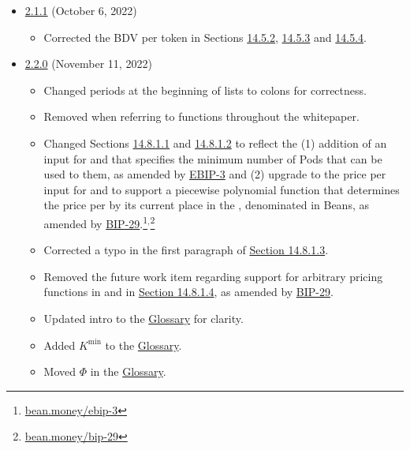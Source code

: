 \documentclass[class=article, crop=false]{standalone}
\begin{document}
\begin{itemize}[topsep=0pt, itemsep=3pt,leftmargin=16pt]
\begin{itemize}
    \end{itemize}  
    \newpage
        \item \href{https://github.com/BeanstalkFarms/Beanstalk-Whitepaper/blob/master/version-history/beanstalk2_1_1.pdf}{2.1.1} (October 6, 2022)
    \begin{itemize}
        \item Corrected the BDV per token in Sections \hyperlink{subsubsection.14.5.2}{14.5.2}, \hyperlink{subsubsection.14.5.3}{14.5.3} and \hyperlink{subsubsection.14.5.4}{14.5.4}.
    \end{itemize}
        \item \href{https://github.com/BeanstalkFarms/Beanstalk-Whitepaper/blob/master/version-history/beanstalk2_2_0.pdf}{2.2.0} (November 11, 2022)
    \begin{itemize}
        \item Changed periods at the beginning of lists to colons for correctness.
        \item Removed \code{()} when referring to functions throughout the whitepaper.
        \item Changed Sections \hyperlink{paragraph.14.8.1.1}{14.8.1.1} and \hyperlink{paragraph.14.8.1.2}{14.8.1.2} to reflect the (1) addition of an input for  and  that specifies the minimum number of Pods that can be used to  them, as amended by \href{https://bean.money/ebip-3}{EBIP-3} and (2) upgrade to the price per  input for  and  to support a piecewise polynomial function that determines the price per  by its current place in the , denominated in Beans, as amended by \href{https://bean.money/bip-29}{BIP-29}.\footnote{\href{https://bean.money/ebip-3}{bean.money/ebip-3}}$^{,}$\footnote{\href{https://bean.money/bip-29}{bean.money/bip-29}}
        \item Corrected a typo in the first paragraph of \hyperlink{paragraph.14.8.1.3}{Section 14.8.1.3}.
        \item Removed the future work item regarding support for arbitrary pricing functions in  and  in \hyperlink{paragraph.14.8.1.4}{Section 14.8.1.4}, as amended by \href{https://bean.money/bip-29}{BIP-29}.
        \item Updated intro to the \hyperlink{subsection.14.11}{Glossary} for clarity.
        \item Added $K^{\text{min}}$ to the \hyperlink{subsection.14.11}{Glossary}.
        \item Moved $\Phi$ in the \hyperlink{subsection.14.11}{Glossary}.

\end{itemize}
\end{itemize}
\end{document}
